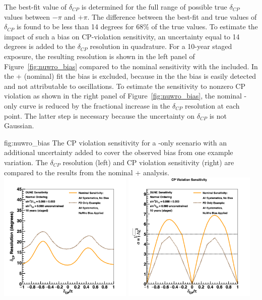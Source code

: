 The best-fit value of $\delta_{CP}$ is determined for the full range of possible true $\delta_{CP}$ values between $-\pi$ and $+\pi$. The difference between the best-fit and true values of $\delta_{CP}$ is found to be less than 14 degrees for 68\% of the true values. To estimate the impact of such a bias on CP-violation sensitivity, an uncertainty equal to 14 degrees is added to the $\delta_{CP}$ resolution in quadrature. For a 10-year staged   exposure, the resulting resolution is shown in the left panel of Figure~\ref{fig:nuwro_bias} compared to the nominal sensitivity with the  included. In the + (nominal) fit the bias is excluded, because in the  the bias is easily detected and not attributable to oscillations. To estimate the sensitivity to nonzero CP violation as shown in the right panel of Figure~\ref{fig:nuwro_bias}, the nominal -only curve is reduced by the fractional increase in the $\delta_{CP}$ resolution at each point. The latter step is necessary because the uncertainty on $\delta_{CP}$ is not Gaussian.

\begin{dunefigure}{fig:nuwro_bias}
{The CP violation sensitivity for a -only scenario with an additional uncertainty added to cover the observed bias from one example variation. The $\delta_{CP}$ resolution (left) and CP violation sensitivity (right) are compared to the results from the nominal + analysis.}
  \includegraphics[width=0.48\textwidth]{graphics/dcpres_nuwrobias_2019_v4.png}
  \includegraphics[width=0.48\textwidth]{graphics/cpv_nuwrobias_2019_v4.png}
\end{dunefigure}

